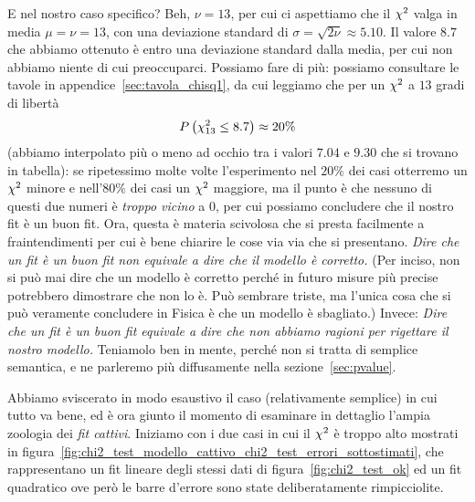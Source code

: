 E nel nostro caso specifico? Beh, $\nu = 13$, per cui ci aspettiamo che il
$\chi^2$ valga in media $\mu = \nu = 13$, con una deviazione standard di
$\sigma = \sqrt{2\nu} \approx 5.10$. Il valore $8.7$ che abbiamo ottenuto è
entro una deviazione standard dalla media, per cui non abbiamo niente di cui
preoccuparci. Possiamo fare di più: possiamo consultare le tavole in
appendice~\ref{sec:tavola_chisq1}, da cui leggiamo che per un $\chi^2$ a
$13$ gradi di libertà
\begin{align*}
  \displaystyle P\left(\chi^2_{13} \leq 8.7\right) \approx 20\%
\end{align*}
(abbiamo interpolato più o meno ad occhio tra i valori $7.04$ e $9.30$ che si
trovano in tabella): se ripetessimo molte volte l'esperimento nel $20\%$ dei
casi otterremo un $\chi^2$ minore e nell'$80\%$ dei casi un $\chi^2$ maggiore,
ma il punto è che nessuno di questi due numeri è \emph{troppo vicino} a $0$,
per cui possiamo concludere che il nostro fit è un buon fit. Ora, questa è
materia scivolosa che si presta facilmente a fraintendimenti per cui è bene
chiarire le cose via via che si presentano.
\emph{Dire che un fit è un buon fit non equivale a dire che il modello è
  corretto.} (Per inciso, non si può mai dire che un modello è
corretto perché in futuro misure più precise potrebbero dimostrare che non
lo è. Può sembrare triste, ma l'unica cosa che si può veramente concludere
in Fisica è che un modello è sbagliato.)
Invece: \emph{Dire che un fit è un buon fit equivale a dire che non abbiamo
ragioni per rigettare il nostro modello.} Teniamolo ben in mente, perché non
si tratta di semplice semantica, e ne parleremo più diffusamente nella
sezione~\ref{sec:pvalue}.

Abbiamo sviscerato in modo esaustivo il caso (relativamente semplice) in cui
tutto va bene, ed è ora giunto il momento di esaminare in dettaglio l'ampia
zoologia dei \emph{fit cattivi}. Iniziamo con i due casi in cui il $\chi^2$ è
troppo alto mostrati
in figura~\ref{fig:chi2_test_modello_cattivo_chi2_test_errori_sottostimati},
che rappresentano un fit lineare degli stessi dati di
figura~\ref{fig:chi2_test_ok} ed un fit quadratico ove però le barre d'errore
sono state deliberatamente rimpicciolite.


